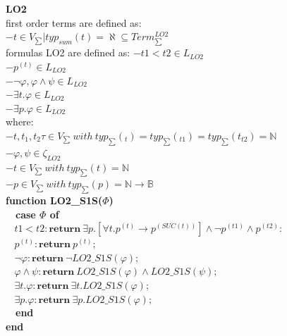 \documentclass{article}
\begin{document}
\begin{multicols}{4}
\textbf{LO2} \\
first order terms are defined as: \\
$-{\textit{t} \in V_{\sum} | typ_{sum}(\textit{t}) = \aleph} \subseteq Term _{\sum}^{LO2} $ \\
formulas LO2 are defined as:
$-t1 < t2 \in L_{LO2} $ \\
$-p^{(t)} \in L_{LO2}$ \\
$-\neg\varphi, \varphi \wedge \psi \in L_{LO2}$ \\
$-\exists t. \varphi \in L_{LO2} $ \\
$-\exists p. \varphi \in L_{LO2} $ \\
where: \\
$-t, t_{1}, t_{2}\tau \in V_{\sum} \ with \ typ_{\sum}(_{t}) = typ_{\sum}(_{t1}) = typ_{\sum}(t_{t2}) = \mathbb{N} $ \\
$-\varphi, \psi \in \zeta_{LO2} $ \\
$-t \in V_{\sum} \ with \ typ_{\sum}(t) = \mathbb{N}$ \\
$-p \in V_{\sum} \ with \ typ_{\sum}(p) = \mathbb{N} \rightarrow \mathbb{B}$ \\


\textbf{function LO2\_S1S($\Phi$)} \\
\ \ \textbf{case $\Phi$ of} \\
$\ \ \ \ t1 < t2 : \textbf{return}\ \exists p. [\forall t. p^{(t)} \rightarrow p^{(SUC(t))} ] \wedge \neg p^{(t1)} \wedge p^{(t2)}:$ \\
$\ \ \ \ p^{(t)} : \textbf{return}\ p^{(t)}; $ \\
$\ \ \ \ \neg \varphi : \textbf{return}\ \neg LO2\_S1S(\varphi); $ \\
$\ \ \ \ \varphi \wedge \psi : \textbf{return}\ LO2\_S1S(\varphi) \wedge LO2\_S1S(\psi); $ \\
$\ \ \ \ \exists t.\varphi : \textbf{return}\ \exists t.LO2\_S1S(\varphi);$ \\
$\ \ \ \ \exists p.\varphi : \textbf{return}\ \exists p.LO2\_S1S(\varphi); $ \\
\ \ \textbf{end} \\
\textbf{end} \\


\end{multicols}
\end{document}
